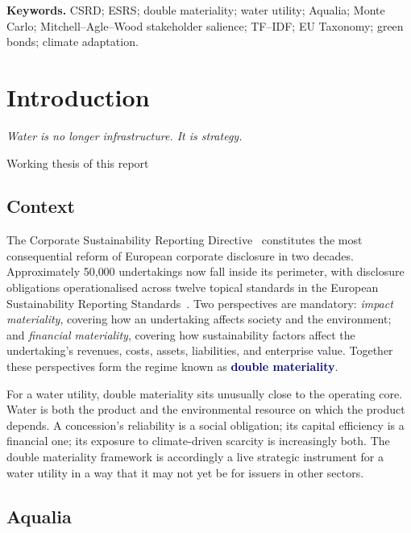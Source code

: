 \documentclass[11pt, a4paper, twoside, openright]{scrreprt}
\newcommand{\signalword}[1]{\textbf{\textcolor{navy}{#1}}}
\begin{document}
\vfill

\noindent\textbf{Keywords.} CSRD; ESRS; double materiality; water utility; Aqualia; Monte Carlo; Mitchell--Agle--Wood stakeholder salience; TF--IDF; EU Taxonomy; green bonds; climate adaptation.

\cleardoublepage
\tableofcontents
\cleardoublepage

\setcounter{page}{1}

\chapter{Introduction}
\label{chap:intro}

\epigraph{\itshape Water is no longer infrastructure. It is strategy.}{\textemdash{} Working thesis of this report}

\section{Context}

The Corporate Sustainability Reporting Directive~\cite{csrd2022} constitutes the most consequential reform of European corporate disclosure in two decades. Approximately 50{,}000 undertakings now fall inside its perimeter, with disclosure obligations operationalised across twelve topical standards in the European Sustainability Reporting Standards~\cite{esrs2023}. Two perspectives are mandatory: \emph{impact materiality}, covering how an undertaking affects society and the environment; and \emph{financial materiality}, covering how sustainability factors affect the undertaking's revenues, costs, assets, liabilities, and enterprise value. Together these perspectives form the regime known as \signalword{double materiality}.

For a water utility, double materiality sits unusually close to the operating core. Water is both the product and the environmental resource on which the product depends. A concession's reliability is a social obligation; its capital efficiency is a financial one; its exposure to climate-driven scarcity is increasingly both. The double materiality framework is accordingly a live strategic instrument for a water utility in a way that it may not yet be for issuers in other sectors.

\section{Aqualia}
\end{document}
